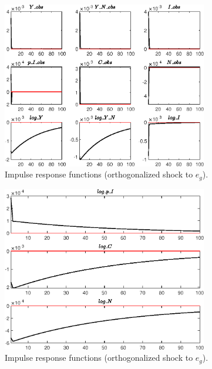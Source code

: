  
\begin{figure}[H]
\centering 
\includegraphics[width=0.80\textwidth]{BRS_growth_res/graphs/BRS_growth_res_IRF_e_g1}
\caption{Impulse response functions (orthogonalized shock to ${e_g}$).}\label{Fig:IRF:e_g:1}
\end{figure}
 
\begin{figure}[H]
\centering 
\includegraphics[width=0.80\textwidth]{BRS_growth_res/graphs/BRS_growth_res_IRF_e_g2}
\caption{Impulse response functions (orthogonalized shock to ${e_g}$).}\label{Fig:IRF:e_g:2}
\end{figure}
 
